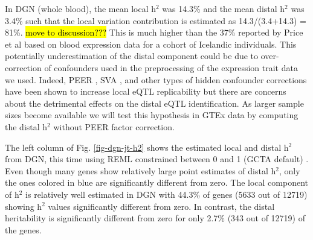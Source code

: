 \documentclass[10pt,letterpaper]{article}
\begin{document}
In DGN (whole blood), the mean local h$^2$ was 14.3\% and the mean distal h$^2$ was 3.4\% such that the local variation contribution is estimated as 14.3/(3.4+14.3) = 81\%. \hl{move to discussion???} This is much higher than the 37\% reported by Price et al \cite{Price_2011} based on blood expression data for a cohort of Icelandic individuals. This potentially underestimation of the distal component could be due to over-correction of confounders used in the preprocessing of the expression trait data we used. Indeed, PEER \cite{Stegle_2012}, SVA \cite{Leek_2007}, and other types of hidden confounder corrections have been shown to increase local eQTL replicability but there are concerns about the detrimental effects on the distal eQTL identification. As larger sample sizes become available we will test this hypothesis in GTEx data by computing the distal h$^2$ without PEER factor correction.

The left column of Fig. \ref{fig-dgn-jt-h2} shows the estimated local and distal h$^2$ from DGN, this time using REML constrained between 0 and 1 (GCTA default) \cite{Yang_2011}. Even though many genes show relatively large point estimates of distal h$^2$, only the ones colored in blue are significantly different from zero. The local component of h$^2$ is relatively well estimated in DGN with 44.3\% of genes  (5633 out of 12719) showing h$^2$ values significantly different from zero. In contrast, the distal heritability is significantly different from zero for only 2.7\% (343 out of 12719) of the genes. 
\end{document}
